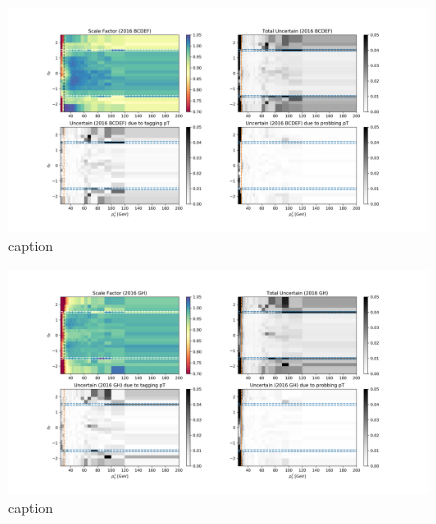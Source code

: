 \begin{figure}
    \centering
    \includegraphics[width=0.99\textwidth]{chapters/Appendix/sectionEleTrigger/figures/result_BCDEF.png}
    
    \caption{caption}
    \label{fig:appendix:ele27SF}
\end{figure}

\begin{figure}
    \centering
    \includegraphics[width=0.99\textwidth]{chapters/Appendix/sectionEleTrigger/figures/result_GH.png}
    
    \caption{caption}
    \label{fig:appendix:ele27SF}
\end{figure}

\FloatBarrier
